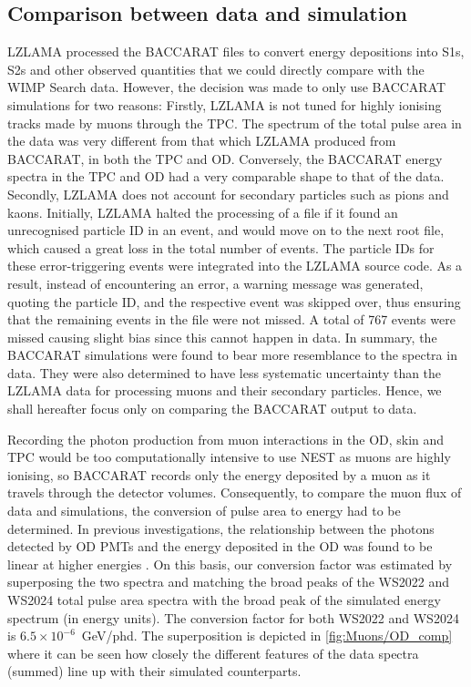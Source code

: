 \subsection{Comparison between data and simulation}\label{sec:Muons/MuonFluxDataSimComp}
LZLAMA processed the BACCARAT files to convert energy depositions into S1s, S2s and other observed quantities that we could directly compare with the WIMP Search data. However, the decision was made to only use BACCARAT simulations for two reasons: Firstly, LZLAMA is not tuned for highly ionising tracks made by muons through the TPC. The spectrum of the total pulse area in the data was very different from that which LZLAMA produced from BACCARAT, in both the TPC and OD. Conversely, the BACCARAT energy spectra in the TPC and OD had a very comparable shape to that of the data. Secondly, LZLAMA does not account for secondary particles such as pions and kaons. Initially, LZLAMA halted the processing of a file if it found an unrecognised particle ID in an event, and would move on to the next root file, which caused a great loss in the total number of events. The particle IDs for these error-triggering events were integrated into the LZLAMA source code. As a result, instead of encountering an error, a warning message was generated, quoting the particle ID, and the respective event was skipped over, thus ensuring that the remaining events in the file were not missed. A total of 767 events were missed causing slight bias since this cannot happen in data. In summary, the BACCARAT simulations were found to bear more resemblance to the spectra in data. They were also determined to have less systematic uncertainty than the LZLAMA data for processing muons and their secondary particles. Hence, we shall hereafter focus only on comparing the BACCARAT output to data.

Recording the photon production from muon interactions in the OD, skin and TPC would be too computationally intensive to use NEST as muons are highly ionising, so BACCARAT records only the energy deposited by a muon as it travels through the detector volumes. Consequently, to compare the muon flux of data and simulations, the conversion of pulse area to energy had to be determined. In previous investigations, the relationship between the photons detected by OD PMTs and the energy deposited in the OD was found to be linear at higher energies \cite{OD_linear}. On this basis, our conversion factor was estimated by superposing the two spectra and matching the broad peaks of the WS2022 and WS2024 total pulse area spectra with the broad peak of the simulated energy spectrum (in energy units). The conversion factor for both WS2022 and WS2024 is $6.5\times10^{-6}$~GeV/phd. The superposition is depicted in \autoref{fig:Muons/OD_comp} where it can be seen how closely the different features of the data spectra (summed) line up with their simulated counterparts.

